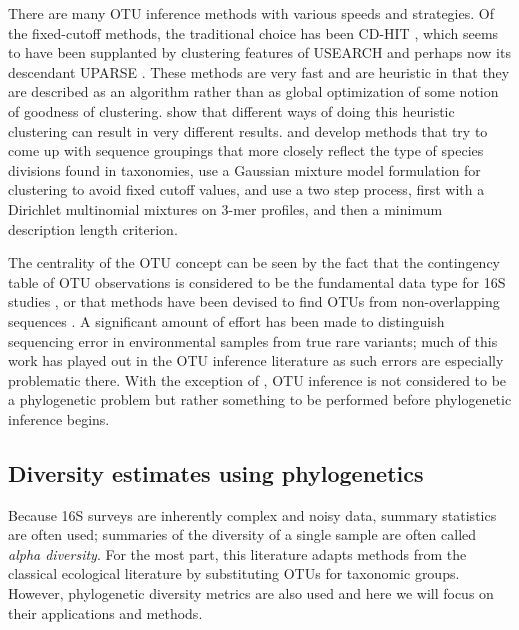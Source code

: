 \documentclass{amsart}
\begin{document}
There are many OTU inference methods with various speeds and strategies.
Of the fixed-cutoff methods, the traditional choice has been CD-HIT \citep{li2006cdhit}, which seems to have been supplanted by clustering features of USEARCH \citep{edgar2010usearch} and perhaps now its descendant UPARSE \citep{edgar2013uparse}.
These methods are very fast and are heuristic in that they are described as an algorithm rather than as global optimization of some notion of goodness of clustering.
\citet{white2010alignment} show that different ways of doing this heuristic clustering can result in very different results.
\citet{navlakha2009finding} and \citet{WYS13} develop methods that try to come up with sequence groupings that more closely reflect the type of species divisions found in taxonomies,
\citet{hao2011clustering} use a Gaussian mixture model formulation for clustering to avoid fixed cutoff values,
and \cite{CWC12} use a two step process, first with a Dirichlet multinomial mixtures on 3-mer profiles, and then a minimum description length criterion.

The centrality of the OTU concept can be seen by the fact that the contingency table of OTU observations is considered to be the fundamental data type for 16S studies \citep{mcdonald2012biological}, or that methods have been devised to find OTUs from non-overlapping sequences \citep{sharpton2011phylotu}.
A significant amount of effort has been made to distinguish sequencing error in environmental samples from true rare variants; much of this work has played out in the OTU inference literature \citep{quince2009accurate,quince2011removing,bragg2012fast,edgar2013uparse} as such errors are especially problematic there.
With the exception of \citet{sharpton2011phylotu}, OTU inference is not considered to be a phylogenetic problem but rather something to be performed before phylogenetic inference begins.

\subsection{Diversity estimates using phylogenetics}

Because 16S surveys are inherently complex and noisy data, summary statistics are often used; summaries of the diversity of a single sample are often called \emph{alpha diversity}.
For the most part, this literature adapts methods from the classical ecological literature by substituting OTUs for taxonomic groups.
However, phylogenetic diversity metrics are also used and here we will focus on their applications and methods.
\end{document}
